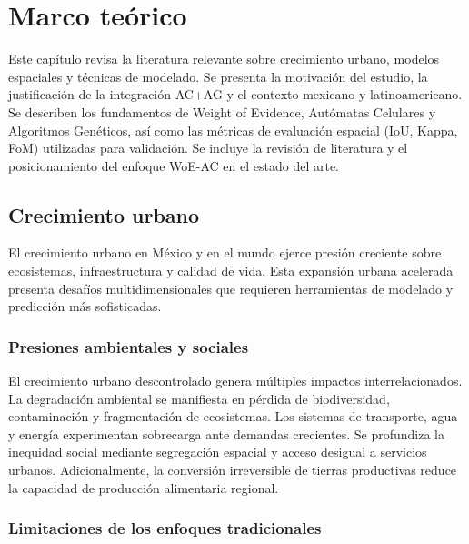 
\chapter{Marco teórico}
\label{ch:marco-teorico}

\begin{resumen}
Este capítulo revisa la literatura relevante sobre crecimiento urbano, modelos espaciales y técnicas de modelado. Se presenta la motivación del estudio, la justificación de la integración AC+AG y el contexto mexicano y latinoamericano. Se describen los fundamentos de Weight of Evidence, Autómatas Celulares y Algoritmos Genéticos, así como las métricas de evaluación espacial (IoU, Kappa, FoM) utilizadas para validación. Se incluye la revisión de literatura y el posicionamiento del enfoque WoE-AC en el estado del arte.
\end{resumen}

\section{Crecimiento urbano}

El crecimiento urbano en México y en el mundo ejerce presión creciente sobre ecosistemas, infraestructura y calidad de vida. Esta expansión urbana acelerada presenta desafíos multidimensionales que requieren herramientas de modelado y predicción más sofisticadas.

\subsection{Presiones ambientales y sociales}

El crecimiento urbano descontrolado genera múltiples impactos interrelacionados. La degradación ambiental se manifiesta en pérdida de biodiversidad, contaminación y fragmentación de ecosistemas. Los sistemas de transporte, agua y energía experimentan sobrecarga ante demandas crecientes. Se profundiza la inequidad social mediante segregación espacial y acceso desigual a servicios urbanos. Adicionalmente, la conversión irreversible de tierras productivas reduce la capacidad de producción alimentaria regional.

\subsection{Limitaciones de los enfoques tradicionales}

